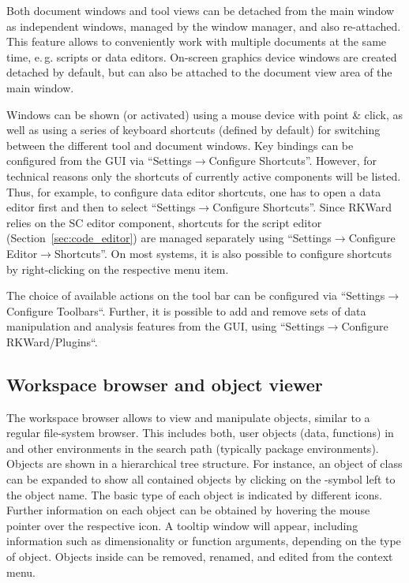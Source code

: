 Both document windows and tool views can be detached from the main
window as independent windows, managed by the window manager, and also
re-attached. This feature allows to conveniently work with multiple documents
at the same time, e.\,g. scripts or data editors. On{}-screen
graphics device windows are created detached by default, but can also
be attached to the document view area of the main window.

Windows can be shown (or activated) using a mouse device with point \&
click, as well as using a series of keyboard shortcuts (defined by
default) for switching between the different tool and document windows.
Key bindings can be configured from the GUI via ``Settings$\rightarrow$Configure Shortcuts''.
However, for technical reasons only the shortcuts of currently active components
will be listed. Thus, for example, to
configure data editor shortcuts, one has to open a data editor first and
then to select ``Settings$\rightarrow$Configure Shortcuts''. Since RKWard relies on the
 SC editor component,
shortcuts for the script editor (Section~\ref{sec:code_editor}) are managed separately using
``Settings$\rightarrow$Configure Editor$\rightarrow$Shortcuts''. On most systems, it is also
possible to configure shortcuts by right-clicking on the respective
menu item.

The choice of available actions on the tool bar can be
configured via ``Settings$\rightarrow$Configure Toolbars``. Further, it is possible to add and remove sets
of data manipulation and analysis features from the GUI, using
``Settings$\rightarrow$Configure RKWard/Plugins``.

\subsection{Workspace browser and object viewer}
\label{sec:workspace_browser_object_viewer}

The workspace browser allows to view
and manipulate  objects, similar
to a regular file-system browser. This includes both, user objects
(data, functions) in  and other environments in the
 search path (typically
 package environments). Objects are shown
in a hierarchical tree structure. For instance, an object of class
 can be expanded to show all contained objects
by clicking on the \code{+}-symbol left to the object name.
The basic type of each object is indicated by different icons. Further
information on each object can be obtained by hovering the mouse
pointer over the respective icon. A tooltip window will appear,
including information such as dimensionality or function arguments,
depending on the type of object. Objects inside  can be
removed, renamed, and edited from the context menu.

